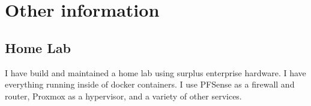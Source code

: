 \documentclass[letterpaper]{twentysecondcv} %
\begin{document}

\section{Other information}

\subsection{Home Lab}

I have build and maintained a home lab using surplus enterprise hardware. I have everything running inside of docker containers.  I use PFSense as a firewall and router, Proxmox as a hypervisor, and a variety of other services.







\end{document}

